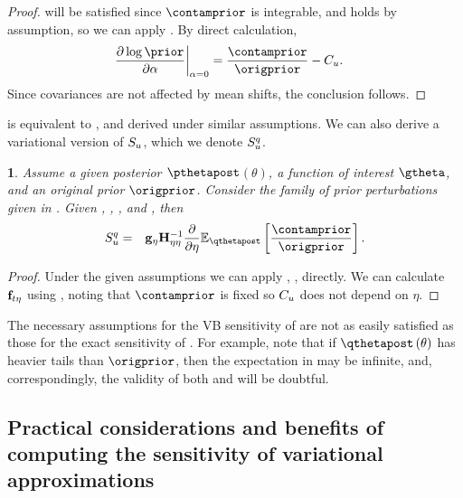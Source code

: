 \documentclass{article}\usepackage[]{graphicx}\usepackage[]{color}
\theoremstyle{plain}
\theoremstyle{definition}
\theoremstyle{plain}
\theoremstyle{plain}
\theoremstyle{plain}
\newtheorem{prop}[thm]{\protect\propositionname}
\theoremstyle{plain}
\providecommand{\propositionname}{Proposition}
\begin{document}
\begin{proof}
 will be satisfied since $\contamprior$
is integrable, and  holds by assumption,
so we can apply . By direct calculation,
\begin{align}
\left.\frac{\partial\log\prior}{\partial\alpha}\right|_{\alpha=0} & =\frac{\contamprior}{\origprior}-\contamnorm.\label{eq:log_prior_deriv}
\end{align}
Since covariances are not affected by mean shifts, the conclusion
follows.
\end{proof}
%
 is equivalent to \citet[Result 8]{gustafson:1996:localmarginals},
and derived under similar assumptions. We can also derive a variational
version of $S_{u}$, which we denote $S_{u}^{q}$.
\begin{prop}
\label{prop:vb_epsilon_sensitivity}Assume a given posterior $\pthetapost$$\left(\theta\right)$,
a function of interest $\gtheta$, and an original prior $\origprior$.
Consider the family of prior perturbations given in .
Given , ,
, and , then
\begin{eqnarray}
\qsensfunc & = & \eggrad\klhess^{-1}\frac{\partial}{\partial\eta}\mbe_{\qthetapost}\left[\frac{\contamprior}{\origprior}\right].\label{eq:vb_epsilon_sensitivity}
\end{eqnarray}
\end{prop}

\begin{proof}
Under the given assumptions we can apply ,
, directly. We can calculate
$\mathbf{f}_{t\eta}$ using , noting that $\contamprior$
is fixed so $C_{u}$ does not depend on $\eta$.
\end{proof}
The necessary assumptions for the VB sensitivity of 
are not as easily satisfied as those for the exact sensitivity of
. For example, note that
if $\qthetapost\left(\theta\right)$ has heavier tails than $\origprior$,
then the expectation in  may
be infinite, and, correspondingly, the validity of both 
and  will be doubtful.

\subsection{Practical considerations and benefits of computing the sensitivity
of variational approximations\label{subsec:lrvb_implementation}}
\end{document}
